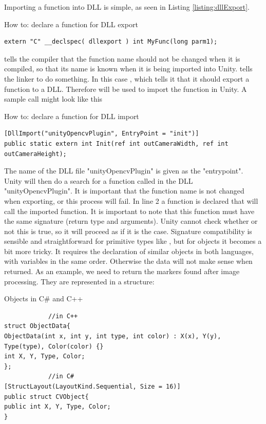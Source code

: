 		Importing a function into DLL is simple, as seen in Listing \ref{listing:dllExport}.
\begin{listing}[H]
\caption{How to: declare a function for DLL export}
\label{listing:dllExport}
\begin{verbatim}
extern "C" __declspec( dllexport ) int MyFunc(long parm1);
\end{verbatim}
\end{listing}
 tells the compiler that the function name should not be changed when it is compiled, so that its name is known when it is being imported into Unity.  tells the linker to do something. In this case , which tells it that it should export a function to a DLL. Therefore  will be used to import the function in Unity. A sample call might look like this\\
\begin{listing}[H]
	\caption{How to: declare a function for DLL import}
	\label{listing:dllImport}
	\begin{verbatim}
[DllImport("unityOpencvPlugin", EntryPoint = "init")]
public static extern int Init(ref int outCameraWidth, ref int outCameraHeight);
	\end{verbatim}
\end{listing}
The name of the DLL file "unityOpencvPlugin" is given as the "entrypoint". Unity will then do a search for a function called  in the DLL "unityOpencvPlugin". It is important that the function name is not changed when exporting, or this process will fail. In line 2 a function is declared that will call the imported function. It is important to note that this function must have the same signature (return type and arguments). Unity cannot check whether or not this is true, so it will proceed as if it is the case. Signature compatibility is sensible and straightforward for primitive types like , but for objects it becomes a bit more tricky. It requires the declaration of similar objects in both languages, with variables in the same order. Otherwise the data will not make sense when returned. As an example, we need to return the markers found after image processing. They are represented in a structure: 
\begin{listing}[H]
	\caption{Objects in C\# and C++}
	\label{listing:objects}
	\begin{verbatim}
			//in C++
struct ObjectData{
ObjectData(int x, int y, int type, int color) : X(x), Y(y), Type(type), Color(color) {}
int X, Y, Type, Color;
};
			//in C#	
[StructLayout(LayoutKind.Sequential, Size = 16)]
public struct CVObject{
public int X, Y, Type, Color;
}
	\end{verbatim}
\end{listing}
